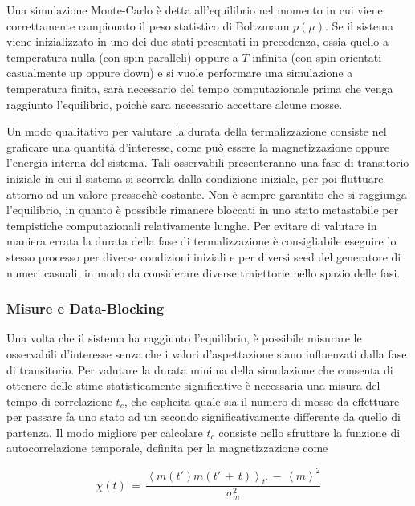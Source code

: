 Una simulazione Monte-Carlo è detta all'equilibrio nel momento in cui viene correttamente campionato il peso statistico di Boltzmann 
$p\left(\mu\right)$. Se il sistema viene inizializzato in uno dei due stati presentati in precedenza, ossia quello a temperatura 
nulla (con spin paralleli) oppure a $T$ infinita (con spin orientati casualmente up oppure down) e si vuole performare una simulazione a 
temperatura finita, sarà necessario del tempo computazionale prima che venga raggiunto l'equilibrio, poichè sara necessario accettare 
alcune mosse.

Un modo qualitativo per valutare la durata della termalizzazione consiste nel graficare una quantità d'interesse, 
come può essere la magnetizzazione oppure l'energia interna del sistema. Tali osservabili presenteranno una fase di transitorio 
iniziale in cui il sistema si scorrela dalla condizione iniziale, per poi fluttuare attorno ad un valore pressochè costante. Non è 
sempre garantito che si raggiunga l'equilibrio, in quanto è possibile rimanere bloccati in uno stato metastabile per tempistiche 
computazionali relativamente lunghe. Per evitare di valutare in maniera errata la durata della fase di termalizzazione è consigliabile 
eseguire lo stesso processo per diverse condizioni iniziali e per diversi seed del generatore di numeri casuali, in modo da considerare 
diverse traiettorie nello spazio delle fasi.  




\subsubsection{Misure e Data-Blocking}

Una volta che il sistema ha raggiunto l'equilibrio, è possibile misurare le osservabili d'interesse senza che i valori d'aspettazione 
siano influenzati dalla fase di transitorio. Per valutare la durata minima della simulazione che consenta di ottenere delle stime 
statisticamente significative è necessaria una misura del tempo di correlazione $t_c$, che esplicita quale sia il numero di mosse 
da effettuare per passare fa uno stato ad un secondo significativamente differente da quello di partenza. Il modo migliore per 
calcolare $t_c$ consiste nello sfruttare la funzione di autocorrelazione temporale, definita per la magnetizzazione come 

\begin{equation}
    \chi\left(t\right)\,=\,\frac{\left<m\left(t'\right)m\left(t'\,+\,t\right)\right>_{t'}\,-\,\left<m\right>^2}{\sigma^2_m}
    \label{eq: auto_corr_m}
\end{equation}

